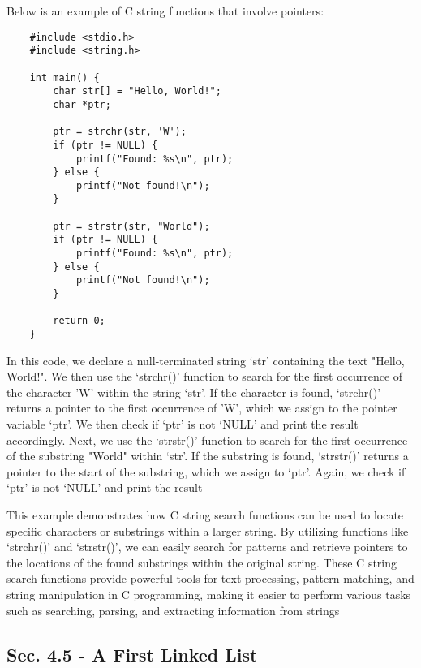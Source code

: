 \begin{solution}
    Below is an example of C string functions that involve pointers:
    
    \horizontalline
    
    \begin{verbatim}   
    #include <stdio.h>
    #include <string.h>
    
    int main() {
        char str[] = "Hello, World!";
        char *ptr;
    
        ptr = strchr(str, 'W');
        if (ptr != NULL) {
            printf("Found: %s\n", ptr);
        } else {
            printf("Not found!\n");
        }
    
        ptr = strstr(str, "World");
        if (ptr != NULL) {
            printf("Found: %s\n", ptr);
        } else {
            printf("Not found!\n");
        }
    
        return 0;
    }
        \end{verbatim}
    
    \horizontalline

    In this code, we declare a null-terminated string `str' containing the text "Hello, World!". We then use the `strchr()' function to search for the first occurrence of the character 'W' within the string `str'. If the character is found, `strchr()' 
    returns a pointer to the first occurrence of 'W', which we assign to the pointer variable `ptr'. We then check if `ptr' is not `NULL' and print the result accordingly. Next, we use the `strstr()' function to search for the first occurrence of the 
    substring "World" within `str'. If the substring is found, `strstr()' returns a pointer to the start of the substring, which we assign to `ptr'. Again, we check if `ptr' is not `NULL' and print the result
    
    This example demonstrates how C string search functions can be used to locate specific characters or substrings within a larger string. By utilizing functions like `strchr()' and `strstr()', we can easily search for patterns and retrieve pointers 
    to the locations of the found substrings within the original string. These C string search functions provide powerful tools for text processing, pattern matching, and string manipulation in C programming, making it easier to perform various tasks 
    such as searching, parsing, and extracting information from strings
\end{solution}

\subsection*{Sec. 4.5 - A First Linked List}

